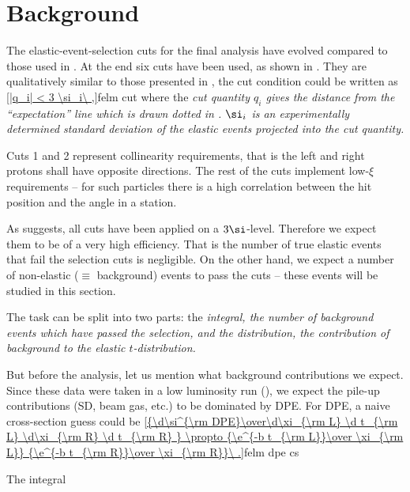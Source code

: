 \section{Background}

The elastic-event-selection cuts for the final analysis have evolved compared to those used in . At the end six cuts have been used, as shown in . They are qualitatively similar to those presented in , the cut condition could be written as
\eqref{|q_i| < 3 \si_i\ ,}{felm cut}
where the \em{cut quantity} $q_i$ gives the distance from the ``expectation'' line which is drawn dotted in . $\si_i$ is an experimentally determined standard deviation of the elastic events projected into the cut quantity.

Cuts 1 and 2 represent collinearity requirements, that is the left and right protons shall have opposite directions. The rest of the cuts implement low-$\xi$ requirements -- for such particles there is a high correlation between the hit position and the angle in a station.


As  suggests, all cuts have been applied on a $3\si$-level. Therefore we expect them to be of a very high efficiency. That is the number of true elastic events that fail the selection cuts is negligible. On the other hand, we expect a number of non-elastic ($\equiv$ background) events to pass the cuts -- these events will be studied in this section.

The task can be split into two parts: the \em{integral}, the number of background events which have passed the selection, and the \em{distribution}, the contribution of background to the elastic $t$-distribution.

But before the analysis, let us mention what background contributions we expect. Since these data were taken in a low luminosity run (), we expect the pile-up contributions (SD, beam gas, etc.) to be dominated by DPE. For DPE, a naive cross-section guess could be 
\eqref{{\d\si^{\rm DPE}\over\d\xi_{\rm L} \d t_{\rm L} \d\xi_{\rm R} \d t_{\rm R} } \propto {\e^{-b t_{\rm L}}\over \xi_{\rm L}} {\e^{-b t_{\rm R}}\over \xi_{\rm R}}\ .}{felm dpe cs}

\caption{The integral}

